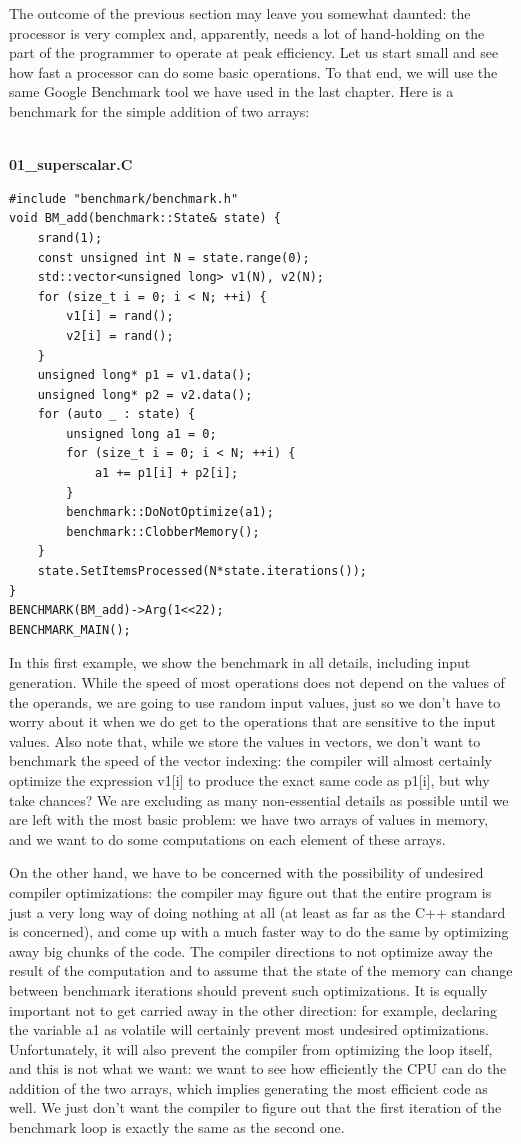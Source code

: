 
The outcome of the previous section may leave you somewhat daunted: the processor is very complex and, apparently, needs a lot of hand-holding on the part of the programmer to operate at peak efficiency. Let us start small and see how fast a processor can do some basic operations. To that end, we will use the same Google Benchmark tool we have used in the last chapter. Here is a benchmark for the simple addition of two arrays:

\hspace*{\fill} \\ %
\noindent
\textbf{01\_superscalar.C}
\begin{lstlisting}[style=styleCXX]
#include "benchmark/benchmark.h"
void BM_add(benchmark::State& state) {
	srand(1);
	const unsigned int N = state.range(0);
	std::vector<unsigned long> v1(N), v2(N);
	for (size_t i = 0; i < N; ++i) {
		v1[i] = rand();
		v2[i] = rand();
	}
	unsigned long* p1 = v1.data();
	unsigned long* p2 = v2.data();
	for (auto _ : state) {
		unsigned long a1 = 0;
		for (size_t i = 0; i < N; ++i) {
			a1 += p1[i] + p2[i];
		}
		benchmark::DoNotOptimize(a1);
		benchmark::ClobberMemory();
	}
	state.SetItemsProcessed(N*state.iterations());
}
BENCHMARK(BM_add)->Arg(1<<22);
BENCHMARK_MAIN();
\end{lstlisting}

In this first example, we show the benchmark in all details, including input generation. While the speed of most operations does not depend on the values of the operands, we are going to use random input values, just so we don't have to worry about it when we do get to the operations that are sensitive to the input values. Also note that, while we store the values in vectors, we don't want to benchmark the speed of the vector indexing: the compiler will almost certainly optimize the expression v1[i] to produce the exact same code as p1[i], but why take chances? We are excluding as many non-essential details as possible until we are left with the most basic problem: we have two arrays of values in memory, and we want to do some computations on each element of these arrays.

On the other hand, we have to be concerned with the possibility of undesired compiler optimizations: the compiler may figure out that the entire program is just a very long way of doing nothing at all (at least as far as the C++ standard is concerned), and come up with a much faster way to do the same by optimizing away big chunks of the code. The compiler directions to not optimize away the result of the computation and to assume that the state of the memory can change between benchmark iterations should prevent such optimizations. It is equally important not to get carried away in the other direction: for example, declaring the variable a1 as volatile will certainly prevent most undesired optimizations. Unfortunately, it will also prevent the compiler from optimizing the loop itself, and this is not what we want: we want to see how efficiently the CPU can do the addition of the two arrays, which implies generating the most efficient code as well. We just don't want the compiler to figure out that the first iteration of the benchmark loop is exactly the same as the second one.

